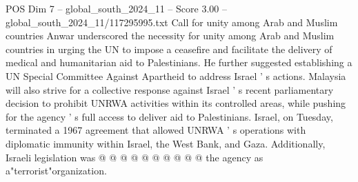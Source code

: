 \begin{textsample}{POS Dim 7 – global\_south\_2024\_11 – Score 3.00 – global\_south\_2024\_11/117295995.txt}
Call for unity among Arab and Muslim countries Anwar underscored the necessity for unity among Arab and Muslim countries in urging the UN to impose a ceasefire and facilitate the delivery of medical and humanitarian aid to Palestinians.
He further suggested establishing a UN Special Committee Against Apartheid to address Israel ' s actions.
Malaysia will also strive for a collective response against Israel ' s recent parliamentary decision to prohibit UNRWA activities within its controlled areas, while pushing for the agency ' s full access to deliver aid to Palestinians.
Israel, on Tuesday, terminated a 1967 agreement that allowed UNRWA ' s operations with diplomatic immunity within Israel, the West Bank, and Gaza.
Additionally, Israeli legislation was @ @ @ @ @ @ @ @ @ @ the agency as a"terrorist"organization.

\end{textsample}
